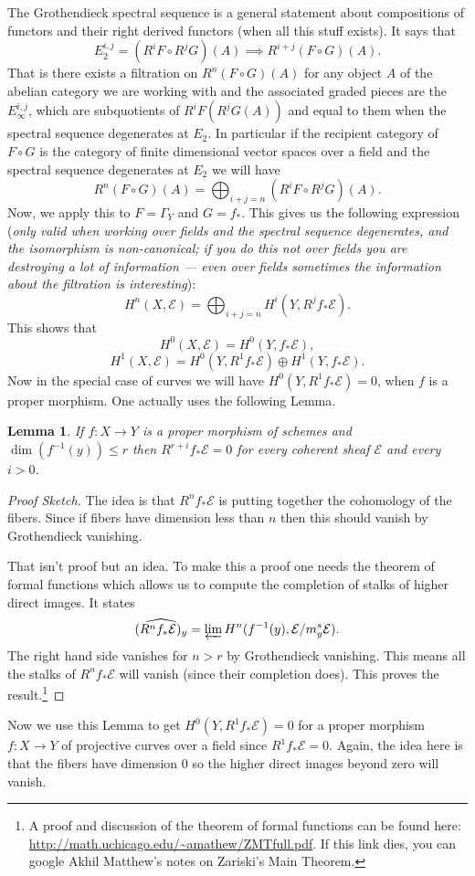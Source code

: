 \documentclass[12pt]{article}
\numberwithin{equation}{section}
\newtheorem{lemma}[theorem]{Lemma}
\theoremstyle{definition}
\theoremstyle{remark}
\newcommand{\Ecal}{\mathcal{E}}
\begin{document}
The Grothendieck spectral sequence is a general statement about compositions of functors and their right derived functors (when all this stuff exists). It says that 
$$ E_2^{i,j}=(R^iF\circ R^jG)(A) \implies R^{i+j}(F\circ G)(A).$$
That is there exists a filtration on $R^{n}(F\circ G)(A)$ for any object $A$ of the abelian category we are working with and the associated graded pieces are the $E_{\infty}^{i,j}$, which are subquotients of $R^iF(R^jG(A))$ and equal to them when the spectral sequence degenerates at $E_2$. 
In particular if the recipient category of $F\circ G$ is the category of finite dimensional vector spaces over a field and the spectral sequence degenerates at $E_2$ we will have 
$$ R^{n}(F\circ G)(A) = \bigoplus_{i+j=n} (R^iF \circ R^jG)(A).$$
Now, we apply this to $F=\Gamma_Y$ and $G=f_*$. 
This gives us the following expression (\emph{only valid when working over fields and the spectral sequence degenerates, and the isomorphism is non-canonical; if you do this not over fields you are destroying a lot of information --- even over fields sometimes the information about the filtration is interesting}):
$$ H^n(X,\Ecal) = \bigoplus_{i+j=n} H^i(Y,R^jf_*\Ecal).$$
This shows that 
$$ H^0(X,\Ecal) = H^0(Y,f_*\Ecal),$$
$$ H^1(X,\Ecal) = H^0(Y,R^1f_*\Ecal) \oplus H^1(Y,f_*\Ecal).$$
Now in the special case of curves we will have $H^0(Y,R^1f_*\Ecal)=0$, when $f$ is a proper morphism. 
One actually uses the following Lemma.
\begin{lemma}
	If $f:X\to Y$ is a proper morphism of schemes and $\dim(f^{-1}(y))\leq r$ then $R^{r+i}f_*\Ecal=0$ for every coherent sheaf $\Ecal$ and every $i>0$.  
\end{lemma}
\begin{proof}[Proof Sketch]
	The idea is that $R^nf_*\Ecal$ is putting together the cohomology of the fibers. 
	Since if fibers have dimension less than $n$ then this should vanish by Grothendieck vanishing. 
	
	That isn't proof but an idea. 
	To make this a proof one needs the theorem of formal functions which allows us to compute the completion of stalks of higher direct images. 
	It states 
	$$ \widehat{(R^nf_*\Ecal)_y} = \varprojlim H^n(f^{-1}(y), \Ecal/m_y^s\Ecal). $$
	The right hand side vanishes for $n>r$ by Grothendieck vanishing. 
	This means all the stalks of $R^nf_*\Ecal$ will vanish (since their completion does).
	This proves the result.\footnote{
		A proof and discussion of the theorem of formal functions can be found here: \url{http://math.uchicago.edu/~amathew/ZMTfull.pdf}. If this link dies, you can google Akhil Matthew's notes on Zariski's Main Theorem.	
	}
\end{proof}
Now we use this Lemma to get $H^0(Y,R^1f_*\Ecal)=0$ for a proper morphism $f:X\to Y$ of projective curves over a field since $R^1f_*\Ecal=0$.
Again, the idea here is that the fibers have dimension $0$ so the higher direct images beyond zero will vanish.
\end{document}
